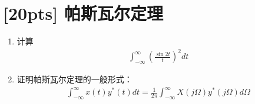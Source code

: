 \documentclass[a4paper,UTF8]{article}
\numberwithin{equation}{section}
\begin{document}
\newpage
\section{[20pts] 帕斯瓦尔定理 }
\begin{enumerate}[(1)]
    \item 计算
    \begin{equation*}
        \begin{aligned}
        \int^{\infty}_{-\infty}\left(\frac{\sin 2t}{t}\right)^2dt
        \end{aligned}
    \end{equation*}
	\item 证明帕斯瓦尔定理的一般形式：
	\begin{equation*}
        \begin{aligned}
        \int^{\infty}_{-\infty}x(t)y^{*}(t)dt=\frac{1}{2\pi}\int^{\infty}_{-\infty}X(j\Omega)y^{*}(j\Omega)d\Omega
        \end{aligned}
    \end{equation*}
\end{enumerate}
\end{document}
